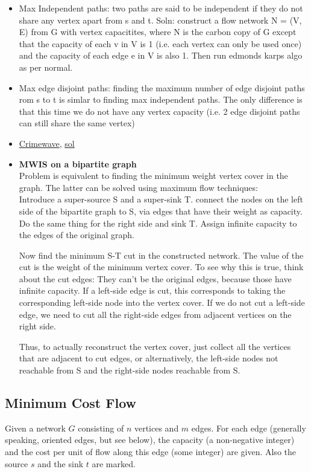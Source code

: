 \documentclass[8pt, a4paper, oneside, twocolumn]{extarticle}
\begin{document}
\begin{itemize}
    \item Max Independent paths: two paths are said to be independent if they do not share any vertex apart from s and t. Soln: construct a flow network N = (V, E) from G with vertex capacitites, where N is the carbon copy of G except that the capacity of each v in V is 1 (i.e. each vertex can only be used once) and the capacity of each edge e in V is also 1. Then run edmonds karps algo as per normal.
    \item Max edge disjoint paths: finding the maximum number of edge disjoint paths rom s to t is simlar to finding max independent paths. The only difference is that this time we do not have any vertex capacity (i.e. 2 edge disjoint paths can still share the same vertex)
    \item \href{https://uva.onlinejudge.org/external/5/563.pdf}{Crimewave}, \href{https://gist.github.com/sourabh2311/d9125c7f5149f80b267514b66ec65d3b}{sol} 
    \item \textbf{MWIS on a bipartite graph}
    \\Problem is equivalent to finding the minimum weight vertex cover in the graph. The latter can be solved using maximum flow techniques:
    \\Introduce a super-source S and a super-sink T. connect the nodes on the left side of the bipartite graph to S, via edges that have their weight as capacity. Do the same thing for the right side and sink T. Assign infinite capacity to the edges of the original graph.

    Now find the minimum S-T cut in the constructed network. The value of the cut is the weight of the minimum vertex cover. To see why this is true, think about the cut edges: They can't be the original edges, because those have infinite capacity. If a left-side edge is cut, this corresponds to taking the corresponding left-side node into the vertex cover. If we do not cut a left-side edge, we need to cut all the right-side edges from adjacent vertices on the right side.

    Thus, to actually reconstruct the vertex cover, just collect all the vertices that are adjacent to cut edges, or alternatively, the left-side nodes not reachable from S and the right-side nodes reachable from S.
    

\end{itemize}
\subsection{Minimum Cost Flow}
Given a network $G$ consisting of $n$ vertices and $m$ edges. For each edge (generally speaking, oriented edges, but see below), the capacity (a non-negative integer) and the cost per unit of flow along this edge (some integer) are given. Also the source $s$ and the sink $t$ are marked.
\end{document}

